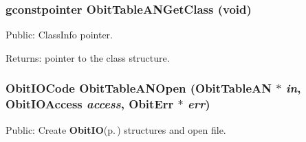 \subsubsection{\setlength{\rightskip}{0pt plus 5cm}gconstpointer Obit\-Table\-ANGet\-Class (void)}\label{ObitTableAN_8h_a13}


Public: Class\-Info pointer. 

\begin{Desc}
\item[Returns:]pointer to the class structure. \end{Desc}
\subsubsection{\setlength{\rightskip}{0pt plus 5cm}Obit\-IOCode Obit\-Table\-ANOpen ({\bf Obit\-Table\-AN} $\ast$ {\em in}, Obit\-IOAccess {\em access}, {\bf Obit\-Err} $\ast$ {\em err})}\label{ObitTableAN_8h_a17}


Public: Create {\bf Obit\-IO}{\rm (p.\,\pageref{structObitIO})} structures and open file. 

